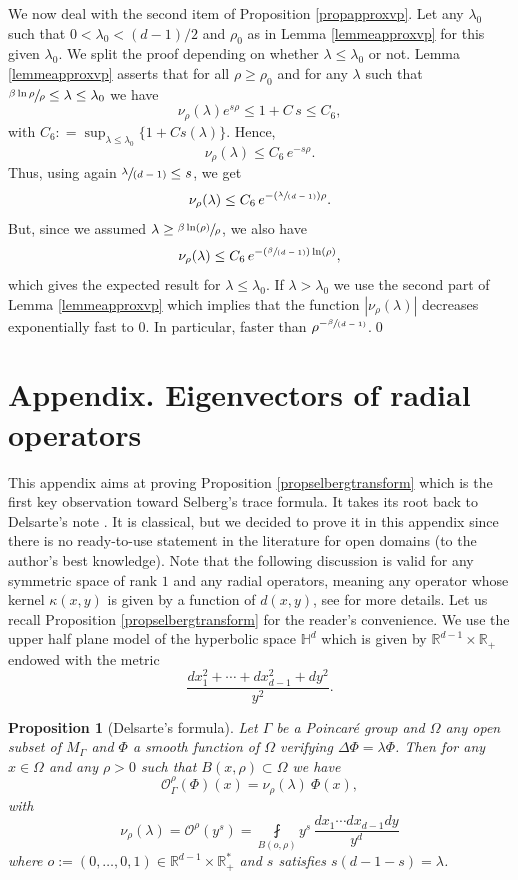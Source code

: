 \documentclass[JEP,XML,SOM,Unicode,NoFloatCountersInSection,published]{cedram}
\let\mathcal\mathscr
\newcommand{\Pspfrac}[2]{(\sfrac{#1}{(#2)})}
\newcommand{\spfrac}[2]{\sfrac{#1}{(#2)}}
\theoremstyle{plain}
\newtheorem{proposition}[equation]{Proposition}
\theoremstyle{definition}
\newcommand{\RR}{\mathbb{R}}
\newcommand{\finte}[3]{\underset{#1}{\fint} {#2} \, {#3}}
\begin{document}
We now deal with the second item of Proposition \ref{propapproxvp}. Let any $\lambda_0$ such that \hbox{$0 < \lambda_0 < (d-1)/2$} and $\rho_0$ as in Lemma \ref{lemmeapproxvp} for this given $\lambda_0$. We split the proof depending on whether $\lambda \le \lambda_0$ or not. Lemma \ref{lemmeapproxvp} asserts that for all $\rho \ge \rho_0$ and for any $\lambda$ such that $\sfrac{\beta \ln \rho}{\rho} \le \lambda \le \lambda_0$ we have
\[
\nu_{\rho}(\lambda) e^{s \rho} \le 1 + C \, s \le C_6,
\]
with $C_6 : = \sup_{\lambda \le \lambda_0} \{ 1 + C s(\lambda) \}$. Hence,
\[
\nu_{\rho}(\lambda) \le C_6 \, e^{-s \rho}.
\]
Thus, using again $ \spfrac{\lambda}{d-1} \le s$, we get
\[
\nu_{\rho}(\lambda) \le C_6 \, e^{- \Pspfrac{\lambda}{d-1} \rho}.
\]
But, since we assumed $\lambda \ge \sfrac{\beta \ln(\rho) }{\rho}$, we also have
\[
\nu_{\rho}(\lambda) \le C_6 \, e^{- \Pspfrac{\beta}{d-1} \ln(\rho)},
\]
which gives the expected result for $\lambda \le \lambda_0$. If $\lambda > \lambda_0$ we use the second part of Lemma \ref{lemmeapproxvp} which implies that the function $|\nu_{\rho}(\lambda)|$ decreases exponentially fast to $0$. In particular, faster than $\rho^{-\spfrac{\beta}{d-1}}$.\qed

\appendix
{}
\section*{Appendix. Eigenvectors of radial operators}
\label{secselbergspretrace}
This appendix aims at proving Proposition \ref{propselbergtransform} which is the first key observation toward Selberg's trace formula. It takes its root back to Delsarte's note \cite{artdelsarte}. It is classical, but we decided to prove it in this appendix since there is no ready-to-use statement in the literature for open domains (to the author's best knowledge). Note that the following discussion is valid for any symmetric space of rank $1$ and any radial operators, meaning any operator whose kernel $\kappa(x,y)$ is given by a function of $d(x,y)$, see \cite[Chap.\,11]{livrechavel} for more details. Let us recall Proposition \ref{propselbergtransform} for the reader's convenience. We use the upper half plane model of the hyperbolic space $\mathbb{H}^d$ which is given by $\RR^{d-1} \times \RR_+$ endowed with the metric
\[
\frac{dx^2_1 +\cdots + dx^2_{d-1} + dy^2}{y^{2}}.
\]

\begin{proposition}[Delsarte's formula]
Let $\Gamma$ be a Poincaré group and $\Omega$ any open subset of $M_{\Gamma}$ and $\Phi$ a smooth function of $\Omega$ verifying $\Delta \Phi = \lambda \Phi$. Then for any $x \in \Omega$ and any $\rho > 0$ such that $B(x,\rho) \subset \Omega$ we have
\begin{equation*}
\mathcal{O}_{\Gamma}^{\rho}(\Phi)(x) = \nu_{\rho}(\lambda) \ \Phi(x),
\end{equation*}
with
\begin{equation*}
\nu_{\rho}(\lambda) = \mathcal{O}^{\rho}(y^s) = \finte{B(o,\rho)} { y^s}{ \frac{dx_1\cdots dx_{d-1} dy}{y^d}}
\end{equation*}
where $o := (0,\dots, 0, 1) \in \RR^{d-1} \times \RR_+^*$ and $s$ satisfies $s(d-1-s) = \lambda$.
\end{proposition}
\end{document}
